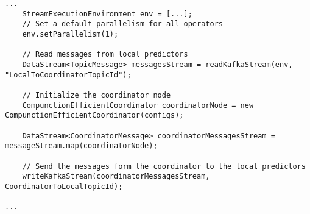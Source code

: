 \begin{lstlisting}[caption={The coordinator Flink program.},label={algonline:flink2},frame=single]
...
	StreamExecutionEnvironment env = [...];
	// Set a default parallelism for all operators 
	env.setParallelism(1);
 
	// Read messages from local predictors
	DataStream<TopicMessage> messagesStream = readKafkaStream(env, "LocalToCoordinatorTopicId");
	
	// Initialize the coordinator node
	CompunctionEfficientCoordinator coordinatorNode = new CompunctionEfficientCoordinator(configs);
	
	DataStream<CoordinatorMessage> coordinatorMessagesStream = messageStream.map(coordinatorNode);
	
	// Send the messages form the coordinator to the local predictors
	writeKafkaStream(coordinatorMessagesStream, CoordinatorToLocalTopicId);

...
\end{lstlisting}

                 